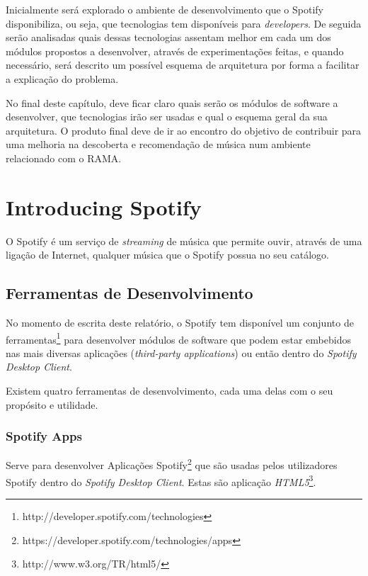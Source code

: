 Inicialmente será explorado o ambiente de desenvolvimento que o Spotify disponibiliza, ou seja, que tecnologias tem disponíveis para \emph{developers}.
De seguida serão analisadas quais dessas tecnologias assentam melhor em cada um dos módulos propostos a desenvolver, através de experimentações feitas, e quando necessário, será descrito um possível esquema de arquitetura por forma a facilitar a explicação do problema.


No final deste capítulo, deve ficar claro quais serão os módulos de software a desenvolver, que tecnologias irão ser usadas e qual o esquema geral da sua arquitetura.
O produto final deve de ir ao encontro do objetivo de contribuir para uma melhoria na descoberta e recomendação de música num ambiente relacionado com o RAMA.


\section{Introducing Spotify} %
\label{sec:spotify}

  O Spotify é um serviço de \emph{streaming} de música que permite ouvir, através de uma ligação de Internet, qualquer música que o Spotify possua no seu catálogo.


  \subsection{Ferramentas de Desenvolvimento} %
  \label{sub:ferramentas_de_desenvolvimento}
  
    No momento de escrita deste relatório, o Spotify tem disponível um conjunto de ferramentas\footnote{http://developer.spotify.com/technologies} para desenvolver módulos de software que podem estar embebidos nas mais diversas aplicações (\emph{third-party applications}) ou então dentro do \emph{Spotify Desktop Client}.

    Existem quatro ferramentas de desenvolvimento, cada uma delas com o seu propósito e utilidade.


    \subsubsection{Spotify Apps} %
    \label{ssub:spotify_apps}
      Serve para desenvolver Aplicações Spotify\footnote{https://developer.spotify.com/technologies/apps} que são usadas pelos utilizadores Spotify dentro do \emph{Spotify Desktop Client}. Estas são aplicação \emph{HTML5}\footnote{http://www.w3.org/TR/html5/}.

